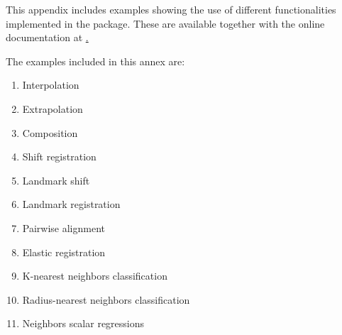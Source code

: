 

This appendix includes examples showing the use of different functionalities
implemented in the package. These  are available
together with the online documentation at
\href{https://fda.readthedocs.io/en/latest/auto_examples/}.

The examples included in this annex are:

\begin{enumerate}
\item Interpolation
\item Extrapolation
\item Composition
\item Shift registration
\item Landmark shift
\item Landmark registration
\item Pairwise alignment
\item Elastic registration
\item K-nearest neighbors classification
\item Radius-nearest neighbors classification
\item Neighbors scalar regressions

\end{enumerate}












